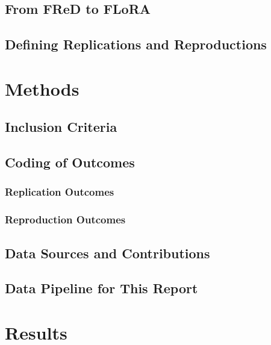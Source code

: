 \documentclass[
  11pt,
  a4paper,
]{article}
\begin{document}
\subsection{From FReD to FLoRA}\label{from-fred-to-flora}

\subsection{Defining Replications and
Reproductions}\label{defining-replications-and-reproductions}

\section{Methods}\label{sec-methods}

\subsection{Inclusion Criteria}\label{inclusion-criteria}

\subsection{Coding of Outcomes}\label{coding-of-outcomes}

\subsubsection{Replication Outcomes}\label{replication-outcomes}

\subsubsection{Reproduction Outcomes}\label{reproduction-outcomes}

\subsection{Data Sources and
Contributions}\label{data-sources-and-contributions}

\subsection{Data Pipeline for This
Report}\label{data-pipeline-for-this-report}

\section{Results}\label{sec-results}
\end{document}
